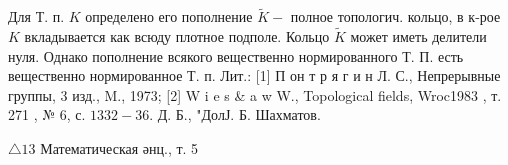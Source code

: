 \documentclass[10pt]{article}
\begin{document}
Для Т. п. $K$ определено его пополнение $\widetilde{K}-$ полное топологич. кольцо, в к-рое $K$ вкладывается как всюду плотное подполе. Кольцо $\tilde{K}$ может иметь делители нуля. Однако пополнение всякого вещественно нормированного Т. П. есть вещественно нормированное Т. п. Лит.: [1] П он т р я г и н Л. С., Непрерывные группы, 3 изд., M., 1973; [2] W i e s \& a w W., Topological fields, Wroc1983 , т. 271 , № 6, с. $1332-36$. Д. Б., "ДолЈ. Б. Шахматов.



$\triangle 13$ Математическая әнц., т. 5
\end{document}
